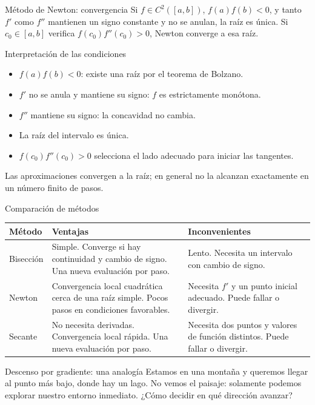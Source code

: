 \documentclass[original_version/main.tex]{subfiles}
\begin{document}
\begin{frame}[t]{Método de Newton: convergencia}
\small
Si $f\in C^2([a,b])$, $f(a)f(b)<0$, y tanto $f'$ como $f''$ mantienen un signo constante y no se anulan, la raíz es única.
\medskip
Si $c_0\in[a,b]$ verifica $f(c_0)f''(c_0)>0$, Newton converge a esa raíz.
\end{frame}
\begin{frame}[t]{Interpretación de las condiciones}
\begin{itemize}
\item $f(a)f(b)<0$: existe una raíz por el teorema de Bolzano.
\item $f'$ no se anula y mantiene su signo: $f$ es estrictamente monótona.
\item $f''$ mantiene su signo: la concavidad no cambia.
\item La raíz del intervalo es única.
\item $f(c_0)f''(c_0)>0$ selecciona el lado adecuado para iniciar las tangentes.
\end{itemize}
Las aproximaciones convergen a la raíz; en general no la alcanzan exactamente en un número finito de pasos.
\end{frame}
\begin{frame}[t]{Comparación de métodos}
\scriptsize\setlength{\tabcolsep}{4pt}
\begin{tabular}{|p{}|p{}|p{}|}\hline
\textbf{Método}&\textbf{Ventajas}&\textbf{Inconvenientes}\\\hline
Bisección&Simple. Converge si hay continuidad y cambio de signo. Una nueva evaluación por paso.&Lento. Necesita un intervalo con cambio de signo.\\[5mm]\hline
Newton&Convergencia local cuadrática cerca de una raíz simple. Pocos pasos en condiciones favorables.&Necesita $f'$ y un punto inicial adecuado. Puede fallar o divergir.\\[5mm]\hline
Secante&No necesita derivadas. Convergencia local rápida. Una nueva evaluación por paso.&Necesita dos puntos y valores de función distintos. Puede fallar o divergir.\\[5mm]\hline
\end{tabular}
\end{frame}
\begin{frame}[t]{Descenso por gradiente: una analogía}
Estamos en una montaña y queremos llegar al punto más bajo, donde hay un lago.
\bigskip
No vemos el paisaje: solamente podemos explorar nuestro entorno inmediato.
\bigskip
¿Cómo decidir en qué dirección avanzar?
\end{frame}
\end{document}
